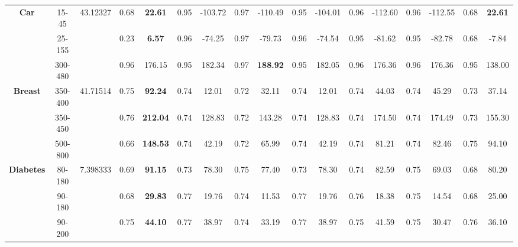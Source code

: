 \documentclass[letterpaper]{article}
\theoremstyle{definition}
\begin{document}
\begin{table}
\begin{tabular}{|c|c|c|c|c|c|c|c|c|c|c|c|c|c|c|c|c|}
\multirow{3}{*}{\textbf{Car}}       & 15-45     & 43.12327  & 0.68  & \textbf{22.61}   & 0.95      & -103.72      & 0.97   & -110.49           & 0.95      & -104.01      & 0.96   & -112.60         & 0.96     & -112.55            & 0.68   & \textbf{22.61}   \\ \cline{2-17} 
                                    & 25-155    &           & 0.23  & \textbf{6.57}    & 0.96      & -74.25       & 0.97   & -79.73            & 0.96      & -74.54       & 0.95   & -81.62          & 0.95     & -82.78             & 0.68   & -7.84            \\ \cline{2-17} 
                                    & 300-480   &           & 0.96  & 176.15           & 0.95      & 182.34       & 0.97   & \textbf{188.92}   & 0.95      & 182.05       & 0.96   & 176.36          & 0.96     & 176.36             & 0.95   & 138.00           \\ \hline
\multirow{3}{*}{\textbf{Breast}}    & 350-400   & 41.71514  & 0.75  & \textbf{92.24}   & 0.74      & 12.01        & 0.72   & 32.11             & 0.74      & 12.01        & 0.74   & 44.03           & 0.74     & 45.29              & 0.73   & 37.14            \\ \cline{2-17} 
                                    & 350-450   &           & 0.76  & \textbf{212.04}  & 0.74      & 128.83       & 0.72   & 143.28            & 0.74      & 128.83       & 0.74   & 174.50          & 0.74     & 174.49             & 0.73   & 155.30           \\ \cline{2-17} 
                                    & 500-800   &           & 0.66  & \textbf{148.53}  & 0.74      & 42.19        & 0.72   & 65.99             & 0.74      & 42.19        & 0.74   & 81.21           & 0.74     & 82.46              & 0.75   & 94.10            \\ \hline
\multirow{3}{*}{\textbf{Diabetes}}  & 80-180    & 7.398333  & 0.69  & \textbf{91.15}   & 0.73      & 78.30        & 0.75   & 77.40             & 0.73      & 78.30        & 0.74   & 82.59           & 0.75     & 69.03              & 0.68   & 80.20            \\ \cline{2-17} 
                                    & 90-180    &           & 0.68  & \textbf{29.83}   & 0.77      & 19.76        & 0.74   & 11.53             & 0.77      & 19.76        & 0.76   & 18.38           & 0.75     & 14.54              & 0.68   & 25.00            \\ \cline{2-17} 
                                    & 90-200    &           & 0.75  & \textbf{44.10}   & 0.77      & 38.97        & 0.74   & 33.19             & 0.77      & 38.97        & 0.75   & 41.59           & 0.75     & 30.47              & 0.76   & 36.10            \\ \hline

\end{tabular}
\end{table}
\end{document}

